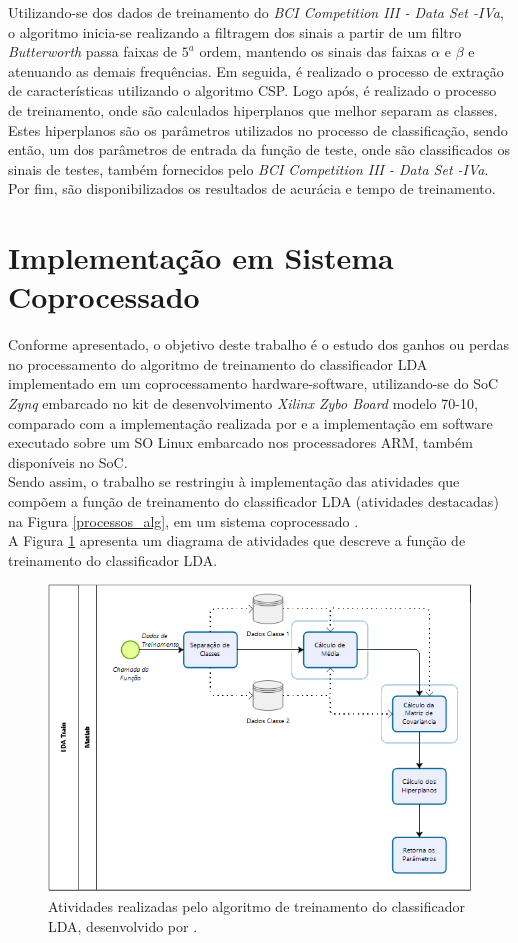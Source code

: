 Utilizando-se dos dados de treinamento do \textit{BCI Competition III - Data Set -IVa}, o algoritmo inicia-se realizando a filtragem dos sinais a partir de um filtro \textit{Butterworth} passa faixas de {$5^a$} ordem, mantendo os sinais das faixas {$\alpha$} e {$\beta$} e atenuando as demais frequências. Em seguida, é realizado o processo de extração de características utilizando o algoritmo CSP. Logo após, é realizado o processo de treinamento, onde são calculados hiperplanos que melhor separam as classes. Estes hiperplanos são os parâmetros utilizados no processo de classificação, sendo então, um dos parâmetros de entrada da função de teste, onde são classificados os sinais de testes, também fornecidos pelo \textit{BCI Competition III - Data Set -IVa}. Por fim, são disponibilizados os resultados de acurácia e tempo de treinamento.

\section{Implementação em Sistema Coprocessado}

Conforme apresentado, o objetivo deste trabalho é o estudo dos ganhos ou perdas no processamento do algoritmo de treinamento do classificador LDA implementado em um coprocessamento hardware-software, utilizando-se do SoC \textit{Zynq} embarcado no kit de desenvolvimento \textit{Xilinx Zybo Board} modelo 70-10, comparado com a implementação realizada por \cite{F.Lotte} e a implementação em software executado sobre um SO Linux embarcado nos processadores ARM, também disponíveis no SoC. \\
Sendo assim, o trabalho se restringiu à implementação das atividades que compõem a função de treinamento do classificador LDA (atividades destacadas) na Figura \ref{processos_alg}, em um sistema coprocessado .\\
A Figura \ref{processos_train} apresenta um diagrama de atividades que descreve a função de treinamento do classificador LDA.

\begin{figure}[h]
	\centering
	\includegraphics[keepaspectratio=true,scale=0.6]{figuras/Processos_LDA_Train.PNG}
	\caption{Atividades realizadas pelo algoritmo de treinamento do classificador LDA, desenvolvido por \cite{F.Lotte}.}
	\label{processos_train}
\end{figure}

